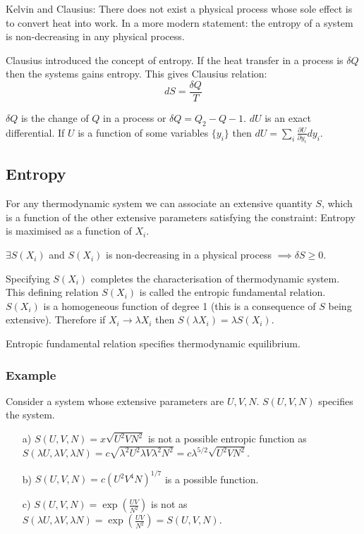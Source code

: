 Kelvin and Clausius: There does not exist a physical process whose sole effect is to convert heat into work. In a more modern statement: the entropy of a system is non-decreasing in any physical process.

Clausius introduced the concept of entropy. If the heat transfer in a process is $\delta Q$ then the systems gains entropy. This gives Clausius relation: $$dS = \frac{\delta Q}{T}$$

$\delta Q$ is the change of $Q$ in a process or $\delta Q = Q_2 - Q-1$. $dU$ is an exact differential. If $U$ is a function of some variables $\{y_i\}$ then $dU = \sum_i \frac{\partial U}{\partial y_i} d y_i$.

\subsection{Entropy}

For any thermodynamic system we can associate an extensive quantity $S$, which is a function of the other extensive parameters satisfying the constraint: Entropy is maximised as a function of $X_i$.

$\exists S(X_i)$ and $S(X_i)$ is non-decreasing in a physical process $\implies \delta S \geq 0$.

Specifying $S(X_i)$ completes the characterisation of thermodynamic system. This defining relation $S(X_i)$ is called the entropic fundamental relation. $S(X_i)$ is a homogeneous function of degree 1 (this is a consequence of $S$ being extensive). Therefore if $X_i \rightarrow \lambda X_i$ then $S(\lambda X_i) = \lambda S(X_i)$.

Entropic fundamental relation specifies thermodynamic equilibrium.

\subsubsection*{Example}

Consider a system whose extensive parameters are $U,V,N$. $S(U,V,N)$ specifies the system.

\begin{itemize}

\item[a)] $S(U,V,N) = x \sqrt{U^2 V N^2}$ is not a possible entropic function as $S(\lambda U, \lambda V, \lambda N) = c \sqrt{\lambda^2 U^2 \lambda V \lambda^2 N^2} = c \lambda^{5/2} \sqrt{U^2 V N^2}$.
\item[b)] $S(U,V,N) = c (U^2 V^4 N)^{1/7}$ is a possible function.
\item[c)] $S(U,V,N) = \exp \left (\frac{UV}{N^2}\right)$ is not as $S(\lambda U, \lambda V, \lambda N) = \exp \left (\frac{UV}{N^2}\right) = S(U,V,N)$.

\end{itemize}

